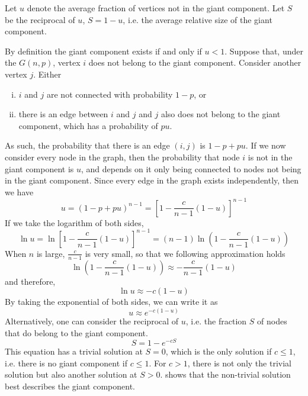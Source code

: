\begin{definition}
Let $u$ denote the average fraction of vertices not in the giant component. Let $S$ be the reciprocal of $u$, $S = 1 - u$, i.e. the average relative size of the giant component.
\end{definition}
\noindent By definition the giant component exists if and only if $u<1$. Suppose that, under the $G(n,p)$, vertex $i$ does not belong to the giant component.
Consider another vertex $j$.
Either
\begin{enumerate}[i)]
	\item $i$ and $j$ are not connected with probability $1-p$, or
	\item there is an edge between $i$ and $j$ and $j$ also does not belong to the giant component, which has a probability of $pu$.
\end{enumerate}
As such, the probability that there is an edge $(i,j)$ is $1-p + pu$.
If we now consider every node in the graph, then the probability that node $i$ is not in the giant component is $u$, and depends on it only being connected to nodes not being in the giant component.
Since every edge in the graph exists independently, then we have
\begin{equation}
	u = (1- p + pu)^{n-1} = \left[ 1 - \frac{c}{n-1} (1-u)\right]^{n-1}
\end{equation}
If we take the logarithm of both sides, 
\begin{equation}
	\ln u = \ln\left[ 1 - \frac{c}{n-1} (1-u)\right]^{n-1} = (n-1) \ln\left( 1-\frac{c}{n-1} (1-u)\right)
\end{equation}
When $n$ is large, $\frac{c}{n-1}$ is very small, so that we following approximation holds
\begin{equation}
	\ln\left( 1-\frac{c}{n-1} (1-u)\right) \approx - \frac{c}{n-1} (1-u)
\end{equation}
and therefore,
\begin{equation}
	\ln u \approx - c (1-u)
\end{equation}
By taking the exponential of both sides, we can write it as
\begin{equation}
	u \approx e^{-c(1-u)}
\end{equation}
Alternatively, one can consider the reciprocal of $u$, i.e. the fraction $S$ of nodes that do belong to the giant component.
\begin{equation}
    \label{eq:s_naive}
	S = 1 - e^{-cS}
\end{equation}
This equation has a trivial solution at $S = 0$, which is the only solution if $c \le 1$, i.e. there is no giant component if $c \le 1$.
For $c > 1$, there is not only the trivial solution but also another solution at $S > 0$.
\cite{newman2010networks} shows that the non-trivial solution best describes the giant component.

